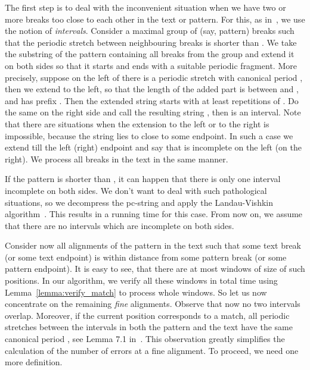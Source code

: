 \documentclass[runningheads]{llncs}
\begin{document}
The first step is to deal with the inconvenient situation when we have two or more breaks too close to each other in the text or pattern. For this, as in~\cite{ColeHariharan}, we use the notion of {\it intervals}. Consider a maximal group of (say, pattern) breaks such that the periodic stretch between neighbouring breaks is shorter than . We take the substring  of the pattern containing all breaks from the group and extend it on both sides so that it starts and ends with a suitable periodic fragment. More precisely, suppose on the left of  there is a periodic stretch with canonical period , then we extend  to the left, so that the length of the added part is between  and , and has prefix . Then the extended string starts with at least  repetitions of . Do the same on the right side and call the resulting string , then  is an interval. Note that there are situations when the extension to the left  or to the right is impossible, because the string  lies to close to some endpoint. In such a case we extend  till the left (right) endpoint and say that  is incomplete on the left (on the right). We process all breaks in the text in the same manner.

If the pattern is shorter than , it can happen that there is only one interval incomplete on both sides. We don't want to deal with such pathological situations, so we decompress the pc-string and apply the Landau-Vishkin algorithm~\cite{Landau}. This results in a  running time for this case. From now on, we assume that there are no intervals which are incomplete on both sides.

Consider now all alignments of the pattern in the text such that some text break (or some text endpoint) is within distance  from some pattern break (or some pattern endpoint). It is easy to see, that there are at most  windows of size  of such positions. In our algorithm, we verify all these windows in total time  using Lemma~\ref{lemma:verify_match} to process whole windows. So let us now concentrate on the remaining {\it fine} alignments. Observe that now no two intervals overlap. Moreover, if the current position corresponds to a match, all periodic stretches between the intervals in both the pattern and the text have the same canonical period , see Lemma 7.1 in~\cite{ColeHariharan}. This observation greatly simplifies the calculation of the number of errors at a fine alignment. To proceed, we need one more definition.
\end{document}
